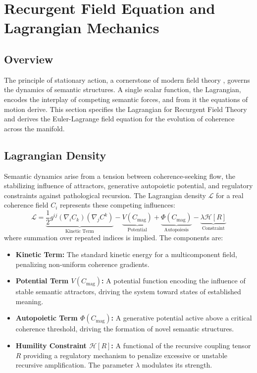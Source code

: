 \chapter{Recurgent Field Equation and Lagrangian Mechanics}

\section{Overview}

The principle of stationary action, a cornerstone of modern field theory \autocite{GoldsteinPooleSafko2002, Arnold1989}, governs the dynamics of semantic structures. A single scalar function, the Lagrangian, encodes the interplay of competing semantic forces, and from it the equations of motion derive. This section specifies the Lagrangian for Recurgent Field Theory and derives the Euler-Lagrange field equation for the evolution of coherence across the manifold.

\section{Lagrangian Density}

Semantic dynamics arise from a tension between coherence-seeking flow, the stabilizing influence of attractors, generative autopoietic potential, and regulatory constraints against pathological recursion. The Lagrangian density \(\mathcal{L}\) for a real coherence field \(C_i\) represents these competing influences:
\begin{equation}
\mathcal{L} = \underbrace{\frac{1}{2} g^{ij} (\nabla_i C_k)(\nabla_j C^k)}_{\text{Kinetic Term}} - \underbrace{V(C_{\text{mag}})}_{\text{Potential}} + \underbrace{\Phi(C_{\text{mag}})}_{\text{Autopoiesis}} - \underbrace{\lambda \mathcal{H}[R]}_{\text{Constraint}}
\end{equation}
where summation over repeated indices is implied. The components are:
\begin{itemize}
    \item \textbf{Kinetic Term:} The standard kinetic energy for a multicomponent field, penalizing non-uniform coherence gradients.
    \item \textbf{Potential Term \(V(C_{\text{mag}})\):} A potential function encoding the influence of stable semantic attractors, driving the system toward states of established meaning.
    \item \textbf{Autopoietic Term \(\Phi(C_{\text{mag}})\):} A generative potential active above a critical coherence threshold, driving the formation of novel semantic structures.
    \item \textbf{Humility Constraint \(\mathcal{H}[R]\):} A functional of the recursive coupling tensor \(R\) providing a regulatory mechanism to penalize excessive or unstable recursive amplification. The parameter \(\lambda\) modulates its strength.
\end{itemize}

